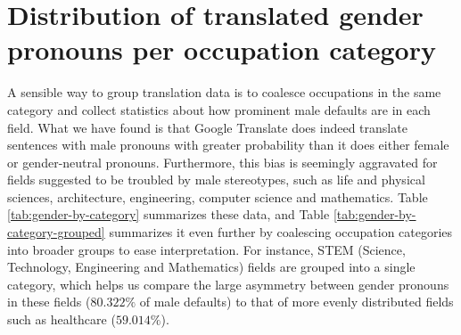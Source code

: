 \documentclass[fleqn,10pt]{article}
\begin{document}
\section{Distribution of translated gender pronouns per occupation category}

A sensible way to group translation data is to coalesce occupations in the same category and collect statistics about how prominent male defaults are in each field. What we have found is that Google Translate does indeed translate sentences with male pronouns with greater probability 
than it does either female or gender-neutral pronouns. Furthermore, this bias is seemingly aggravated for fields suggested to be troubled by male stereotypes,
such as life and physical sciences, architecture, engineering, computer science and mathematics. Table \ref{tab:gender-by-category} summarizes these data, and Table \ref{tab:gender-by-category-grouped} summarizes it even further by coalescing occupation categories into broader groups to ease interpretation. For instance, STEM (Science, Technology, Engineering and Mathematics) fields are grouped into a single category, which helps us compare the large asymmetry between gender pronouns in these fields ($80.322\%$ of male defaults) to that of more evenly distributed fields such as healthcare ($59.014\%$).
\end{document}
